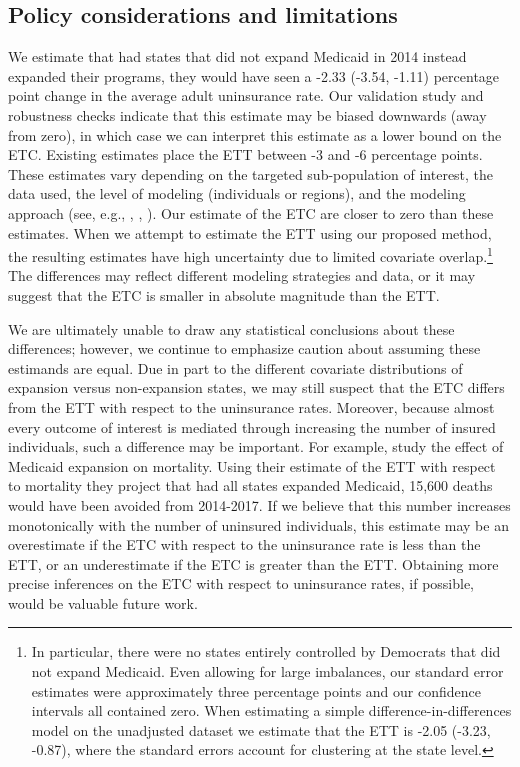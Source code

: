 \documentclass[aoas]{imsart}
\theoremstyle{plain}
\theoremstyle{remark}
\begin{document}
\subsection{Policy considerations and limitations}

We estimate that had states that did not expand Medicaid in 2014 instead expanded their programs, they would have seen a -2.33 (-3.54, -1.11) percentage point change in the average adult uninsurance rate. Our validation study and robustness checks indicate that this estimate may be biased downwards (away from zero), in which case we can interpret this estimate as a lower bound on the ETC. Existing estimates place the ETT between -3 and -6 percentage points. These estimates vary depending on the targeted sub-population of interest, the data used, the level of modeling (individuals or regions), and the modeling approach (see, e.g., \cite{courtemanche2017early}, \cite{kaestner2017effects}, \cite{frean2017premium}). Our estimate of the ETC are closer to zero than these estimates. When we attempt to estimate the ETT using our proposed method, the resulting estimates have high uncertainty due to limited covariate overlap.\footnote{In particular, there were no states entirely controlled by Democrats that did not expand Medicaid. Even allowing for large imbalances, our standard error estimates were approximately three percentage points and our confidence intervals all contained zero. When estimating a simple difference-in-differences model on the unadjusted dataset we estimate that the ETT is -2.05 (-3.23, -0.87), where the standard errors account for clustering at the state level.\label{footnote_did}} The differences may reflect different modeling strategies and data, or it may suggest that the ETC is smaller in absolute magnitude than the ETT.

We are ultimately unable to draw any statistical conclusions about these differences; however, we continue to emphasize caution about assuming these estimands are equal. Due in part to the different covariate distributions of expansion versus non-expansion states, we may still suspect that the ETC differs from the ETT with respect to the uninsurance rates. Moreover, because almost every outcome of interest is mediated through increasing the number of insured individuals, such a difference may be important. For example, \cite{miller2019medicaid} study the effect of Medicaid expansion on mortality. Using their estimate of the ETT with respect to mortality they project that had all states expanded Medicaid, 15,600 deaths would have been avoided from 2014-2017. If we believe that this number increases monotonically with the number of uninsured individuals, this estimate may be an overestimate if the ETC with respect to the uninsurance rate is less than the ETT, or an underestimate if the ETC is greater than the ETT. Obtaining more precise inferences on the ETC with respect to uninsurance rates, if possible, would be valuable future work.
\end{document}
